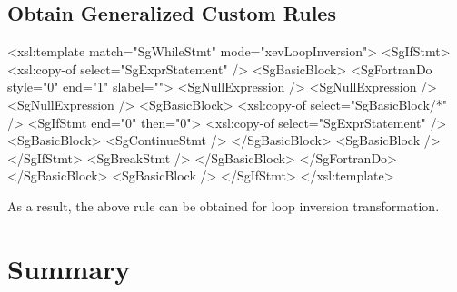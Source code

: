 \subsection{Obtain Generalized Custom Rules}



\begin{framed}
\begin{src}
<xsl:template match="SgWhileStmt" mode="xevLoopInversion">
	<SgIfStmt>
		<xsl:copy-of select="SgExprStatement" />
		<SgBasicBlock>
			<SgFortranDo style="0" end="1" slabel="">
				<SgNullExpression />
				<SgNullExpression />
				<SgNullExpression />
				<SgBasicBlock>
					<xsl:copy-of select="SgBasicBlock/*" />
					<SgIfStmt end="0" then="0">
						<xsl:copy-of select="SgExprStatement" />
						<SgBasicBlock>
							<SgContinueStmt />
						</SgBasicBlock>
						<SgBasicBlock />
					</SgIfStmt>
					<SgBreakStmt />
				</SgBasicBlock>
			</SgFortranDo>
		</SgBasicBlock>
		<SgBasicBlock />
	</SgIfStmt>
</xsl:template>
\end{src}
\end{framed}


As a result, the above rule can be obtained for loop inversion transformation.


\section{Summary}


\fi
